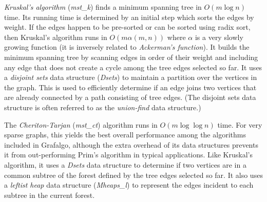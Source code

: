 \documentclass[11pt]{article}
\begin{document}
{\sl Kruskal's algorithm} ({\sl mst\_k}) finds a minimum spanning tree in $O(m \log n)$ time.
Its running time is determined by an initial step which sorts the edges by weight.
If the edges happen to be pre-sorted or can be sorted using radix sort, then
Kruskal's algorithm runs in $O(m \alpha(m,n))$ where $\alpha$ is a very slowly growing
function (it is inversely related to {\sl Ackerman's function}).
It builds the minimum spanning tree by scanning edges in order of their weight and including
any edge that does not create a cycle among the tree edges selected so far.
It uses a {\sl disjoint sets} data structure ({\sl Dsets}) to maintain a partition over the vertices in the graph.
This is used to efficiently determine if an edge joins two vertices that are already connected by
a path consisting of tree edges. (The disjoint sets data structure is often referred to as the
{\sl union-find} data structure.)

The {\sl Cheriton-Tarjan} ({\sl mst\_ct}) algorithm runs in $O(m \log\log n)$ time. For very sparse graphs,
this yields the best overall performance among the algorithms included in Grafalgo, 
although the extra overhead of its data structures
prevents it from out-performing Prim's algorithm in typical applications. Like Kruskal's algorithm,
it uses a {\sl Dsets} data structure to determine if two vertices are in a common subtree of the
forest defined by the tree edges selected so far. It also uses a {\sl leftist heap} data structure ({\sl Mheaps\_l})
to represent the edges incident to each subtree in the current forest.
\end{document}
